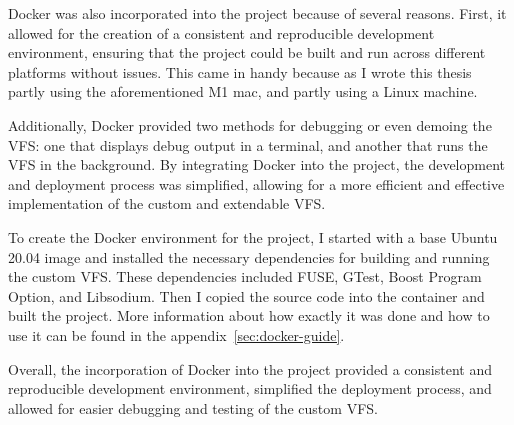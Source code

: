 Docker\cite{docker} was also incorporated into the project because of several reasons.
First, it allowed for the creation of a consistent and reproducible development environment, ensuring that the project could be built and run across different platforms without issues.
This came in handy because as I wrote this thesis partly using the aforementioned M1 mac, and partly using a Linux machine.

Additionally, Docker provided two methods for debugging or even demoing the VFS: one that displays debug output in a terminal, and another that runs the VFS in the background.
By integrating Docker into the project, the development and deployment process was simplified, allowing for a more efficient and effective implementation of the custom and extendable VFS.

To create the Docker environment for the project, I started with a base Ubuntu 20.04 image and installed the necessary dependencies for building and running the custom VFS.
These dependencies included FUSE, GTest, Boost Program Option, and Libsodium.
Then I copied the source code into the container and built the project.
More information about how exactly it was done and how to use it can be found in the appendix~\ref{sec:docker-guide}.

Overall, the incorporation of Docker into the project provided a consistent and reproducible development environment, simplified the deployment process, and allowed for easier debugging and testing of the custom VFS.